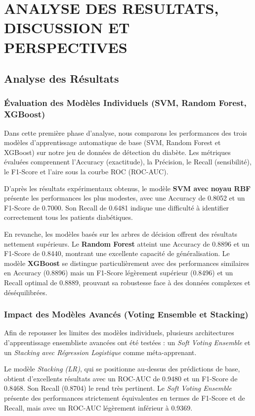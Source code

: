 \chapter{ANALYSE DES RESULTATS, DISCUSSION ET PERSPECTIVES}
\section{Analyse des Résultats}

\subsection{Évaluation des Modèles Individuels (SVM, Random Forest, XGBoost)}
Dans cette première phase d'analyse, nous comparons les performances des trois modèles d'apprentissage automatique de base (SVM, Random Forest et XGBoost) sur notre jeu de données de détection du diabète. Les métriques évaluées comprennent l'Accuracy (exactitude), la Précision, le Recall (sensibilité), le F1-Score et l'aire sous la courbe ROC (ROC-AUC).

D'après les résultats expérimentaux obtenus, le modèle \textbf{SVM avec noyau RBF} présente les performances les plus modestes, avec une Accuracy de 0.8052 et un F1-Score de 0.7000. Son Recall de 0.6481 indique une difficulté à identifier correctement tous les patients diabétiques. 

En revanche, les modèles basés sur les arbres de décision offrent des résultats nettement supérieurs. Le \textbf{Random Forest} atteint une Accuracy de 0.8896 et un F1-Score de 0.8440, montrant une excellente capacité de généralisation. Le modèle \textbf{XGBoost} se distingue particulièrement avec des performances similaires en Accuracy (0.8896) mais un F1-Score légèrement supérieur (0.8496) et un Recall optimal de 0.8889, prouvant sa robustesse face à des données complexes et déséquilibrées.

\subsection{Impact des Modèles Avancés (Voting Ensemble et Stacking)}
Afin de repousser les limites des modèles individuels, plusieurs architectures d'apprentissage ensembliste avancées ont été testées : un \textit{Soft Voting Ensemble} et un \textit{Stacking avec Régression Logistique} comme méta-apprenant.

Le modèle \textit{Stacking (LR)}, qui se positionne au-dessus des prédictions de base, obtient d'excellents résultats avec un ROC-AUC de 0.9480 et un F1-Score de 0.8468. Son Recall (0.8704) le rend très pertinent. Le \textit{Soft Voting Ensemble} présente des performances strictement équivalentes en termes de F1-Score et de Recall, mais avec un ROC-AUC légèrement inférieur à 0.9369.

